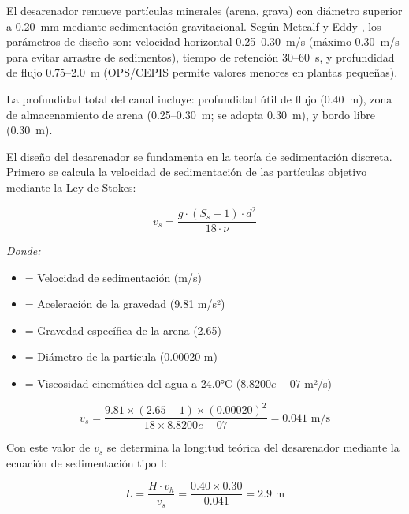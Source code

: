

El desarenador remueve part\'iculas minerales (arena, grava) con di\'ametro superior a 0.20~mm mediante sedimentaci\'on gravitacional. Seg\'un Metcalf y Eddy \cite{metcalf2014}, los par\'ametros de dise\~no son: velocidad horizontal 0.25--0.30~m/s (m\'aximo 0.30~m/s para evitar arrastre de sedimentos), tiempo de retenci\'on 30--60~s, y profundidad de flujo 0.75--2.0~m (OPS/CEPIS \cite{ops2005} permite valores menores en plantas peque\~nas).

La profundidad total del canal incluye: profundidad \'util de flujo (0.40~m), zona de almacenamiento de arena (0.25--0.30~m; se adopta 0.30~m), y bordo libre (0.30~m).

El dise\~no del desarenador se fundamenta en la teor\'ia de sedimentaci\'on discreta. Primero se calcula la velocidad de sedimentaci\'on de las part\'iculas objetivo mediante la Ley de Stokes:

\begin{equation}
v_s = \frac{g \cdot (S_s - 1) \cdot d^2}{18 \cdot \nu}
\end{equation}

\textit{Donde:}
\begin{itemize}[noitemsep,leftmargin=2em]
    \item[$v_s$] = Velocidad de sedimentaci\'on (m/s)
    \item[$g$] = Aceleraci\'on de la gravedad (9.81 m/s²)
    \item[$S_s$] = Gravedad espec\'ifica de la arena (2.65)
    \item[$d$] = Di\'ametro de la part\'icula (0.00020 m)
    \item[$\nu$] = Viscosidad cinem\'atica del agua a 24.0°C ($8.8200e-07$ m²/s)
\end{itemize}

\begin{equation}
v_s = \frac{9.81 \times (2.65 - 1) \times (0.00020)^2}{18 \times 8.8200e-07} = 0.041 \text{ m/s}
\end{equation}

Con este valor de $v_s$ se determina la longitud te\'orica del desarenador mediante la ecuaci\'on de sedimentaci\'on tipo I:

\begin{equation}
L = \frac{H \cdot v_h}{v_s} = \frac{0.40 \times 0.30}{0.041} = 2.9 \text{ m}
\end{equation}

